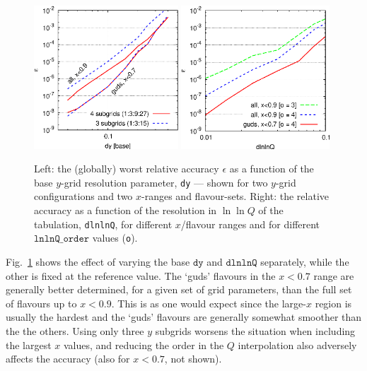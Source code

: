 \documentclass[12pt]{article}
\newcommand{\dy}{\ttt{dy}}
\newcommand{\dlnlnQ}{\ttt{dlnlnQ}}
\newcommand{\ttt}[1]{\texttt{#1}}
\begin{document}
\begin{figure}
  \centering
  \includegraphics[width=0.48\textwidth]{../benchmarking/test_acc/dy.eps}%
  \hfill
  \includegraphics[width=0.495\textwidth]{../benchmarking/test_acc/dlnlnQ.eps}%
  \caption{Left: the (globally) worst relative accuracy $\epsilon$ as
    a function of the base $y$-grid resolution parameter, \ttt{dy} ---
    shown for two $y$-grid configurations and two $x$-ranges and
    flavour-sets.
  Right: the relative accuracy as a function of the
    resolution in $\ln \ln Q$ of the tabulation, \ttt{dlnlnQ}, for
    different $x$/flavour ranges and for different $\ttt{lnlnQ\_order}$
    values (\ttt{o}).}
  \label{fig:dy+dlnlnQ}
\end{figure}

Fig.~\ref{fig:dy+dlnlnQ} shows the effect of varying the base $\dy$
and $\dlnlnQ$ separately, while the other is fixed at the reference
value. The `guds' flavours in the $x<0.7$ range are generally better
determined, for a given set of grid parameters, than the full set of
flavours up to $x<0.9$. This is as one would expect since the
large-$x$ region is usually the hardest and the `guds' flavours are
generally somewhat smoother than the the others. Using only three $y$
subgrids worsens the situation when including the largest $x$ values,
and reducing the order in the $Q$ interpolation also adversely affects
the accuracy (also for $x<0.7$, not shown).
\end{document}
